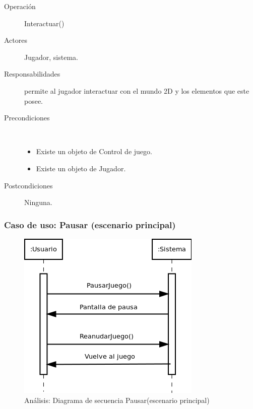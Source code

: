 \begin{description}
    \item [Operación] Interactuar()
    \item [Actores] Jugador, sistema.
    \item [Responsabilidades] permite al jugador interactuar con el mundo 2D y los elementos que este posee.
    \item [Precondiciones] $\quad$
        \begin{itemize}
            \item Existe un objeto de Control de juego.
            \item Existe un objeto de Jugador.
        \end{itemize}
    \item [Postcondiciones] Ninguna.
\end{description}

\subsubsection{Caso de uso: Pausar (escenario principal)}

\begin{figure}[H] 
  \label{secuencia_pausar1}
  \begin{center}
    \includegraphics[scale=0.7]{imagenes/analisis/secuencia_pausar1.png}
  \end{center}
  \caption{Análisis: Diagrama de secuencia Pausar(escenario principal)}
\end{figure}

